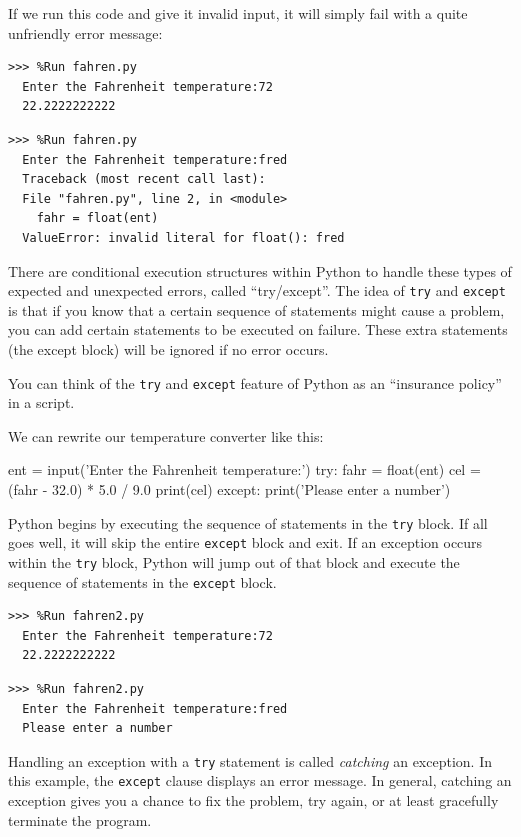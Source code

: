 If we run this code and give it invalid input, it will simply fail with a quite unfriendly error message:

\begin{Verbatim}[frame=single]
>>> %Run fahren.py
  Enter the Fahrenheit temperature:72
  22.2222222222
\end{Verbatim}

\begin{Verbatim}[frame=single]
>>> %Run fahren.py
  Enter the Fahrenheit temperature:fred
  Traceback (most recent call last):
  File "fahren.py", line 2, in <module>
    fahr = float(ent)
  ValueError: invalid literal for float(): fred
\end{Verbatim}

There are conditional execution structures within Python to handle these types of expected and unexpected errors, called ``try/except''. The idea of \texttt{try} and \texttt{except} is that if you know that a certain sequence of statements might cause a problem, you can add certain statements to be executed on failure. These extra statements (the except block) will be ignored if no error occurs.

You can think of the \texttt{try} and \texttt{except} feature of
Python as an ``insurance policy'' in a script.

We can rewrite our temperature converter like this:

\begin{python}
ent = input('Enter the Fahrenheit temperature:')
try:
    fahr = float(ent)
    cel = (fahr - 32.0) * 5.0 / 9.0
    print(cel)
except:
    print('Please enter a number')
\end{python}

Python begins by executing the sequence of statements in the \texttt{try} block. If all goes well, it will skip the entire \texttt{except} block and exit. If an exception occurs within the \texttt{try} block, Python will jump out of that block and execute the sequence of statements in the \texttt{except} block.

\begin{Verbatim}
>>> %Run fahren2.py
  Enter the Fahrenheit temperature:72
  22.2222222222
\end{Verbatim}

\begin{Verbatim}
>>> %Run fahren2.py
  Enter the Fahrenheit temperature:fred
  Please enter a number
\end{Verbatim}

Handling an exception with a \texttt{try} statement is called \emph{catching} an exception. In this example, the \texttt{except} clause displays an error message. In general, catching an exception gives you a chance to fix the problem, try again, or at least gracefully terminate the program.


